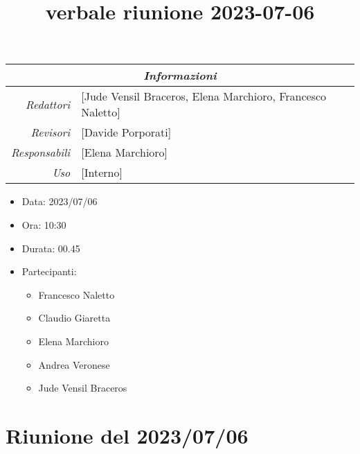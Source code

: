 \documentclass[12pt]{article}
\begin{document}
\graphicspath{ {../../templates/img} }

\title{verbale riunione 2023-07-06}

\firstPage
\maketitle

\begin{center}
\begin{tabular}{r | l}
    \multicolumn{2}{c}{\textit{Informazioni}}\\
    \hline
    
        \textit{Redattori} &
        [Jude Vensil Braceros, Elena Marchioro, Francesco Naletto]\makecell{}\\
    
        \textit{Revisori} &
        [Davide Porporati]\makecell{}\\
        \textit{Responsabili} &
        [Elena Marchioro]\makecell{}\\
            \textit{Uso} & 
            [Interno]\makecell{}\\
\end{tabular}
    \begin{itemize}
    \item[] Data: 2023/07/06
    \item[] Ora: 10:30
    \item[] Durata: 00.45
    \item[] Partecipanti:
    \begin{itemize}
    \item[] Francesco Naletto
    \item[] Claudio Giaretta
    \item[] Elena Marchioro
    \item[] Andrea Veronese
    \item[] Jude Vensil Braceros
    \end{itemize}
\end{itemize}
\end{center}


\tableofcontents
\printindex 
\section{Riunione del 2023/07/06}
\end{document}
